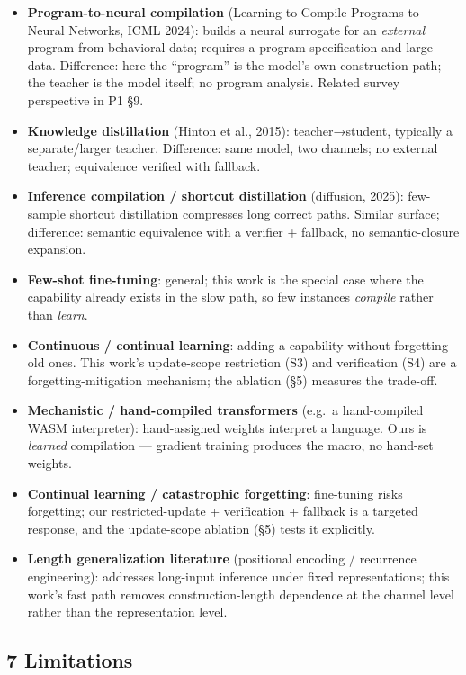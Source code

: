 \documentclass[
]{article}
\providecommand{\tightlist}{%
  \setlength{\itemsep}{0pt}\setlength{\parskip}{0pt}}
\begin{document}
\begin{itemize}
\tightlist
\item
  \textbf{Program-to-neural compilation} (Learning to Compile Programs
  to Neural Networks, ICML 2024): builds a neural surrogate for an
  \emph{external} program from behavioral data; requires a program
  specification and large data. Difference: here the ``program'' is the
  model's own construction path; the teacher is the model itself; no
  program analysis. Related survey perspective in P1 §9.
\item
  \textbf{Knowledge distillation} (Hinton et al., 2015):
  teacher→student, typically a separate/larger teacher. Difference: same
  model, two channels; no external teacher; equivalence verified with
  fallback.
\item
  \textbf{Inference compilation / shortcut distillation} (diffusion,
  2025): few-sample shortcut distillation compresses long correct paths.
  Similar surface; difference: semantic equivalence with a verifier +
  fallback, no semantic-closure expansion.
\item
  \textbf{Few-shot fine-tuning}: general; this work is the special case
  where the capability already exists in the slow path, so few instances
  \emph{compile} rather than \emph{learn}.
\item
  \textbf{Continuous / continual learning}: adding a capability without
  forgetting old ones. This work's update-scope restriction (S3) and
  verification (S4) are a forgetting-mitigation mechanism; the ablation
  (§5) measures the trade-off.
\item
  \textbf{Mechanistic / hand-compiled transformers} (e.g.~a
  hand-compiled WASM interpreter): hand-assigned weights interpret a
  language. Ours is \emph{learned} compilation --- gradient training
  produces the macro, no hand-set weights.
\item
  \textbf{Continual learning / catastrophic forgetting}: fine-tuning
  risks forgetting; our restricted-update + verification + fallback is a
  targeted response, and the update-scope ablation (§5) tests it
  explicitly.
\item
  \textbf{Length generalization literature} (positional encoding /
  recurrence engineering): addresses long-input inference under fixed
  representations; this work's fast path removes construction-length
  dependence at the channel level rather than the representation level.
\end{itemize}

\subsection{7 Limitations}\label{limitations}
\end{document}
